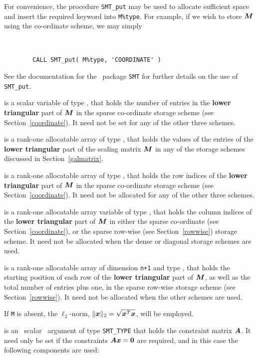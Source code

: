 \documentclass{galahad}
\begin{document}
\begin{description}
\begin{description}
For convenience, the procedure {\tt SMT\_put}
may be used to allocate sufficient space and insert the required keyword
into {\tt M\%type}.
For example, if we wish to store ${\bm{M}}$ using the co-ordinate scheme,
we may simply
{\tt
\begin{verbatim}
        CALL SMT_put( M%type, 'COORDINATE' )
\end{verbatim}
}
\noindent
See the documentation for the \galahad\ package {\tt SMT}
for further details on the use of {\tt SMT\_put}.

 is a scalar variable of type \integer, that
holds the number of entries in the {\bf lower triangular} part of ${\bm{M}}$
in the sparse co-ordinate storage scheme (see Section~\ref{coordinate}).
It need not be set for any of the other three schemes.

 is a rank-one allocatable array of type \realdp, that holds
the values of the entries of the {\bf lower triangular} part
of the scaling matrix ${\bm{M}}$ in any of the
storage schemes discussed in Section~\ref{galmatrix}.

 is a rank-one allocatable array of type \integer,
that holds the row indices of the {\bf lower triangular} part of ${\bm{M}}$
in the sparse co-ordinate storage
scheme (see Section~\ref{coordinate}).
It need not be allocated for any of the other three schemes.

 is a rank-one allocatable array variable of type \integer,
that holds the column indices of the {\bf lower triangular} part of
${\bm{M}}$ in either the sparse co-ordinate
(see Section~\ref{coordinate}), or the sparse row-wise
(see Section~\ref{rowwise}) storage scheme.
It need not be allocated when the dense or diagonal storage schemes are used.

 is a rank-one allocatable array of dimension {\tt n+1} and type
\integer, that holds the starting position of
each row of the {\bf lower triangular} part of ${\bm{M}}$, as well
as the total number of entries plus one, in the sparse row-wise storage
scheme (see Section~\ref{rowwise}). It need not be allocated when the
other schemes are used.

\end{description}
If {\tt M} is absent, the $\ell_2$-norm, $\|{\bm{x}}\|_2 = \sqrt{{\bm{x}}^T {\bm{x}}}$,
will be employed.

 is an \optional\ scalar \intentin\ argument of type {\tt SMT\_TYPE}
that holds the constraint matrix ${\bm{A}}$. It need only be set
if the constraints ${\bm{A}} {\bm{x}} = {\bm{0}}$ are required,
and in this case the following components are used:


\end{description}
\end{document}
